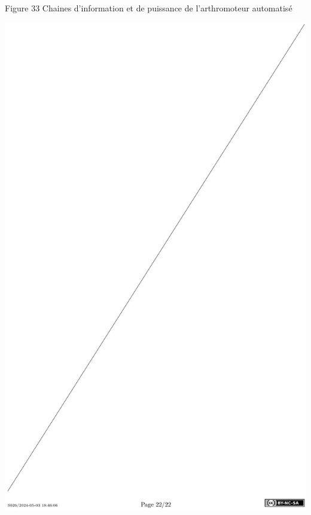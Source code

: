\documentclass[10pt]{article}
\begin{document}
Figure 33 Chaines d'information et de puissance de l'arthromoteur automatisé

\begin{center}
\includegraphics[max width=\textwidth]{2024_07_14_a83aebba33898893d39fg-22}
\end{center}
\end{document}
